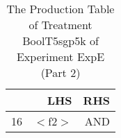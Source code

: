 \begin{table}[ht]
\centering
\begin{tabular}{rrr}
  \hline
 & LHS & RHS \\ 
  \hline
16 & $<$f2$>$ & AND \\ 
   \hline
\end{tabular}
\caption{The Production Table of Treatment BoolT5sgp5k of Experiment ExpE (Part 2)} 
\end{table}
